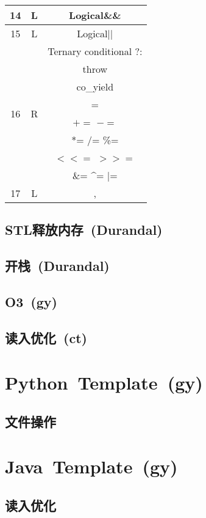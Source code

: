 \begin{tabular}{|c|c|c|}
            \hline
            14 & L & Logical\&\& \\
            \hline
            15 & L & Logical|| \\
            \hline
            \multirow{8}{*}{16} & \multirow{8}{*}{R} & Ternary conditional ?: \\
            && throw \\
            && co\_yield \\
            && = \\
            && $ += $ $ -= $ \\
            && *= /= \%= \\
            && $<<=$ $>>=$ \\
            && \&= \^{}= |= \\
            \hline
            17 & L & , \\
            \hline
        \end{tabular}
    \subsection*{STL释放内存\ \small(Durandal)}
    \subsection*{开栈\ \small(Durandal)}
    \subsection*{O3\ \small(gy)}
    \subsection*{读入优化\ \small(ct)}
\section{Python\ Template\ \small(gy)}
    \subsection*{文件操作}
\section{Java\ Template\ \small(gy)}
    \subsection*{读入优化}
